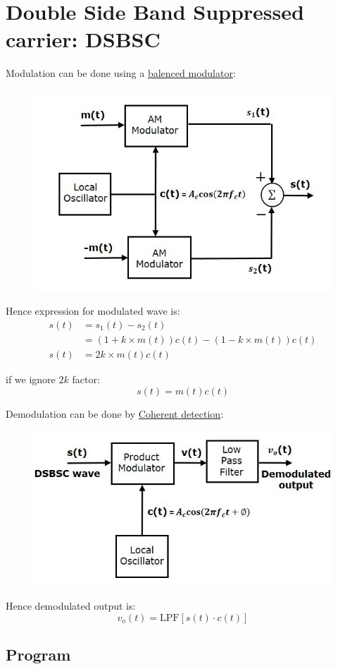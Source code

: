 \pagebreak

\section{Double Side Band Suppressed carrier: DSBSC}

Modulation can be done using a \underline{balenced modulator}:

\begin{figure}[H]
	\centering
	\includegraphics[width=.7\textwidth]{img/balanced_modulator.jpg}
\end{figure}
Hence expression for modulated wave is: 
\begin{align*}
	s(t) &= s_1(t) - s_2(t) \\
	 &= (1 + k \times m(t)) c(t) - (1 - k \times m(t)) c(t) \\
	 s(t)    &= 2k \times m(t) c(t)
\end{align*}

if we ignore $2k$ factor: 
$$s(t) = m(t)c(t)$$


Demodulation can be done by \underline{Coherent detection}: 
\begin{figure}[H]
	\centering
	\includegraphics[width=.7\textwidth]{img/coh_detec.jpg}
\end{figure}

Hence demodulated output is: 
$$v_o(t) = \text{LPF}\left[s(t)\cdot c(t)\right]$$

\subsection*{Program}

